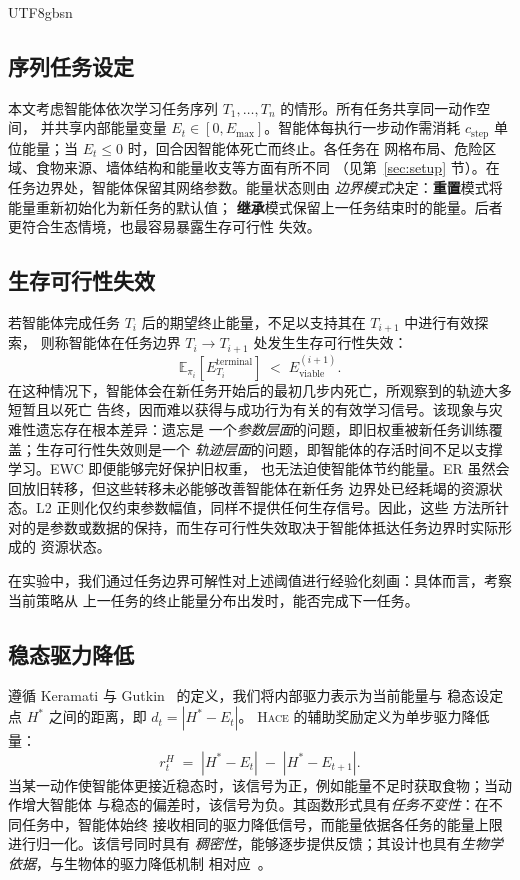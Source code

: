 \documentclass[sigplan,10pt]{acmart}
\newcommand{\setpoint}{H^*}
\newcommand{\energy}{E}
\newcommand{\drive}{d}
\newcommand{\reward}{r}
\newcommand{\hace}{\textsc{Hace}}
\begin{document}
\begin{CJK*}{UTF8}{gbsn}
\subsection{序列任务设定}

本文考虑智能体依次学习任务序列 $T_1, \ldots, T_n$ 的情形。所有任务共享同一动作空间，
并共享内部能量变量 $\energy_t \in [0, \energy_{\max}]$。智能体每执行一步动作需消耗
$c_{\text{step}}$ 单位能量；当 $\energy_t \leq 0$ 时，回合因智能体死亡而终止。各任务在
网格布局、危险区域、食物来源、墙体结构和能量收支等方面有所不同
（见第~\ref{sec:setup} 节）。在任务边界处，智能体保留其网络参数。能量状态则由
\emph{边界模式}决定：\textbf{重置}模式将能量重新初始化为新任务的默认值；
\textbf{继承}模式保留上一任务结束时的能量。后者更符合生态情境，也最容易暴露生存可行性
失效。

\subsection{生存可行性失效}

若智能体完成任务 $T_i$ 后的期望终止能量，不足以支持其在 $T_{i+1}$ 中进行有效探索，
则称智能体在任务边界 $T_i \to T_{i+1}$ 处发生生存可行性失效：
\begin{equation}
  \mathbb{E}_{\pi_i}\!\left[\energy_{T_i}^{\text{terminal}}\right]
  \;\!<\;\! \energy_{\text{viable}}^{(i+1)}.
\end{equation}
在这种情况下，智能体会在新任务开始后的最初几步内死亡，所观察到的轨迹大多短暂且以死亡
告终，因而难以获得与成功行为有关的有效学习信号。该现象与灾难性遗忘存在根本差异：遗忘是
一个\emph{参数层面}的问题，即旧权重被新任务训练覆盖；生存可行性失效则是一个
\emph{轨迹层面}的问题，即智能体的存活时间不足以支撑学习。EWC 即便能够完好保护旧权重，
也无法迫使智能体节约能量。ER 虽然会回放旧转移，但这些转移未必能够改善智能体在新任务
边界处已经耗竭的资源状态。L2 正则化仅约束参数幅值，同样不提供任何生存信号。因此，这些
方法所针对的是参数或数据的保持，而生存可行性失效取决于智能体抵达任务边界时实际形成的
资源状态。

在实验中，我们通过任务边界可解性对上述阈值进行经验化刻画：具体而言，考察当前策略从
上一任务的终止能量分布出发时，能否完成下一任务。

\subsection{稳态驱力降低}

遵循 Keramati 与 Gutkin~\cite{keramati2014} 的定义，我们将内部驱力表示为当前能量与
稳态设定点 $\setpoint$ 之间的距离，即 $\drive_t = |\setpoint - \energy_t|$。
\hace{} 的辅助奖励定义为单步驱力降低量：
\begin{equation}
  \reward_t^H \;=\; |\setpoint - \energy_t| \;-\; |\setpoint - \energy_{t+1}|.
  \label{eq:drive}
\end{equation}
当某一动作使智能体更接近稳态时，该信号为正，例如能量不足时获取食物；当动作增大智能体
与稳态的偏差时，该信号为负。其函数形式具有\emph{任务不变性}：在不同任务中，智能体始终
接收相同的驱力降低信号，而能量依据各任务的能量上限进行归一化。该信号同时具有
\emph{稠密性}，能够逐步提供反馈；其设计也具有\emph{生物学依据}，与生物体的驱力降低机制
相对应~\cite{keramati2014,konidaris2006}。


\end{CJK*}
\end{document}
